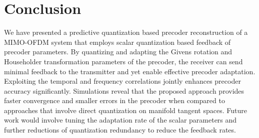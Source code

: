 \documentclass[journal,10pt,twocolumn]{IEEEtran}
\begin{document}




\section{Conclusion}
\label{section4}
We have presented a predictive quantization based precoder
reconstruction of a MIMO-OFDM system that employs scalar quantization
based feedback of precoder parameters. By quantizing and adapting the
Givens rotation and Householder transformation parameters of the
precoder, the receiver can send minimal feedback to the
transmitter and yet enable effective precoder adaptation. Exploiting
the temporal and frequency correlations jointly enhances precoder
accuracy significantly. Simulations reveal that the proposed approach
provides faster convergence and smaller errors in the precoder when
compared to approaches that involve direct quantization on manifold
tangent spaces. Future work would involve tuning the adaptation rate
of the scalar parameters and further reductions of quantization
redundancy to reduce the feedback rates.
\end{document}
